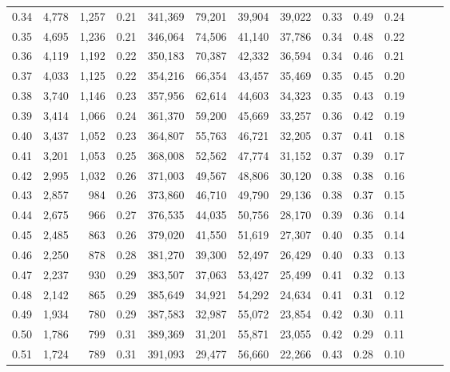 \begin{tabular}{rrrrrrrrrrrrrr}
0.34 &   4,778 &  1,257 &  0.21 &  341,369 &   79,201 &  39,904 &  39,022 &  0.33 &  0.49 &      0.24 \\
0.35 &   4,695 &  1,236 &  0.21 &  346,064 &   74,506 &  41,140 &  37,786 &  0.34 &  0.48 &      0.22 \\
0.36 &   4,119 &  1,192 &  0.22 &  350,183 &   70,387 &  42,332 &  36,594 &  0.34 &  0.46 &      0.21 \\
0.37 &   4,033 &  1,125 &  0.22 &  354,216 &   66,354 &  43,457 &  35,469 &  0.35 &  0.45 &      0.20 \\
0.38 &   3,740 &  1,146 &  0.23 &  357,956 &   62,614 &  44,603 &  34,323 &  0.35 &  0.43 &      0.19 \\
0.39 &   3,414 &  1,066 &  0.24 &  361,370 &   59,200 &  45,669 &  33,257 &  0.36 &  0.42 &      0.19 \\
0.40 &   3,437 &  1,052 &  0.23 &  364,807 &   55,763 &  46,721 &  32,205 &  0.37 &  0.41 &      0.18 \\
0.41 &   3,201 &  1,053 &  0.25 &  368,008 &   52,562 &  47,774 &  31,152 &  0.37 &  0.39 &      0.17 \\
0.42 &   2,995 &  1,032 &  0.26 &  371,003 &   49,567 &  48,806 &  30,120 &  0.38 &  0.38 &      0.16 \\
0.43 &   2,857 &    984 &  0.26 &  373,860 &   46,710 &  49,790 &  29,136 &  0.38 &  0.37 &      0.15 \\
0.44 &   2,675 &    966 &  0.27 &  376,535 &   44,035 &  50,756 &  28,170 &  0.39 &  0.36 &      0.14 \\
0.45 &   2,485 &    863 &  0.26 &  379,020 &   41,550 &  51,619 &  27,307 &  0.40 &  0.35 &      0.14 \\
0.46 &   2,250 &    878 &  0.28 &  381,270 &   39,300 &  52,497 &  26,429 &  0.40 &  0.33 &      0.13 \\
0.47 &   2,237 &    930 &  0.29 &  383,507 &   37,063 &  53,427 &  25,499 &  0.41 &  0.32 &      0.13 \\
0.48 &   2,142 &    865 &  0.29 &  385,649 &   34,921 &  54,292 &  24,634 &  0.41 &  0.31 &      0.12 \\
0.49 &   1,934 &    780 &  0.29 &  387,583 &   32,987 &  55,072 &  23,854 &  0.42 &  0.30 &      0.11 \\
0.50 &   1,786 &    799 &  0.31 &  389,369 &   31,201 &  55,871 &  23,055 &  0.42 &  0.29 &      0.11 \\
0.51 &   1,724 &    789 &  0.31 &  391,093 &   29,477 &  56,660 &  22,266 &  0.43 &  0.28 &      0.10 \\

\end{tabular}
